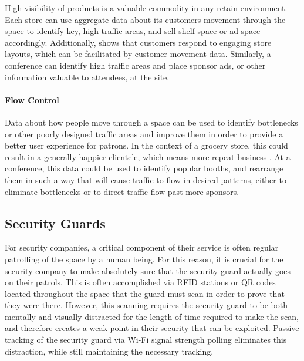High visibility of products is a valuable commodity in any retain environment. Each store can use aggregate data about its customers movement through the space to identify key, high traffic areas, and sell shelf space or ad space accordingly. Additionally, \cite{shukla2013effects} shows that customers respond to engaging store layouts, which can be facilitated by customer movement data. Similarly, a conference can identify high traffic areas and place sponsor ads, or other information valuable to attendees, at the site.

\paragraph{Flow Control}

Data about how people move through a space can be used to identify bottlenecks or other poorly designed traffic areas and improve them in order to provide a better user experience for patrons. In the context of a grocery store, this could result in a generally happier clientele, which means more repeat business \cite{shukla2013effects}. At a conference, this data could be used to identify popular booths, and rearrange them in such a way that will cause traffic to flow in desired patterns, either to eliminate bottlenecks or to direct traffic flow past more sponsors.

\subsection{Security Guards}

For security companies, a critical component of their service is often regular patrolling of the space by a human being. For this reason, it is crucial for the security company to make absolutely sure that the security guard actually goes on their patrols. This is often accomplished via RFID stations or QR codes located throughout the space that the guard must scan in order to prove that they were there. However, this scanning requires the security guard to be both mentally and visually distracted for the length of time required to make the scan, and therefore creates a weak point in their security that can be exploited. Passive tracking of the security guard via Wi-Fi signal strength polling eliminates this distraction, while still maintaining the necessary tracking. 

